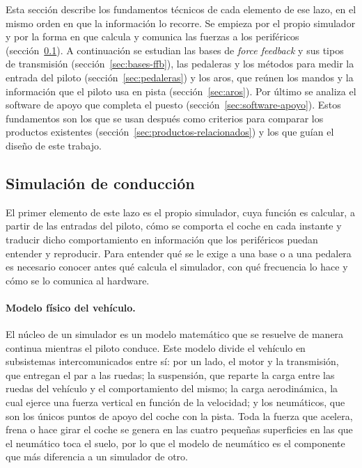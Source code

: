 Esta sección describe los fundamentos técnicos de cada elemento de ese lazo, en el mismo orden en que la información lo recorre. Se empieza por el propio simulador y por la forma en que calcula y comunica las fuerzas a los periféricos (sección~\ref{sec:simulacion-conduccion}). A continuación se estudian las bases de \textit{force feedback} y sus tipos de transmisión (sección~\ref{sec:bases-ffb}), las pedaleras y los métodos para medir la entrada del piloto (sección~\ref{sec:pedaleras}) y los aros, que reúnen los mandos y la información que el piloto usa en pista (sección~\ref{sec:aros}). Por último se analiza el software de apoyo que completa el puesto (sección~\ref{sec:software-apoyo}). Estos fundamentos son los que se usan después como criterios para comparar los productos existentes (sección~\ref{sec:productos-relacionados}) y los que guían el diseño de este trabajo.



\clearpage   %
\subsection{Simulación de conducción}
\label{sec:simulacion-conduccion}
El primer elemento de este lazo es el propio simulador, cuya función es calcular, a partir de las entradas del piloto, cómo se comporta el coche en cada instante y traducir dicho comportamiento en información que los periféricos puedan entender y reproducir. Para entender qué se le exige a una base o a una pedalera es necesario conocer antes qué calcula el simulador, con qué frecuencia lo hace y cómo se lo comunica al hardware.

\paragraph{Modelo físico del vehículo.}
El núcleo de un simulador es un modelo matemático que se resuelve de manera continua mientras el piloto conduce. Este modelo divide el vehículo en subsistemas intercomunicados entre sí: por un lado, el motor y la transmisión, que entregan el par a las ruedas; la suspensión, que reparte la carga entre las ruedas del vehículo y el comportamiento del mismo; la carga aerodinámica, la cual ejerce una fuerza vertical en función de la velocidad; y los neumáticos, que son los únicos puntos de apoyo del coche con la pista. Toda la fuerza que acelera, frena o hace girar el coche se genera en las cuatro pequeñas superficies en las que el neumático toca el suelo, por lo que el modelo de neumático es el componente que más diferencia a un simulador de otro. 

